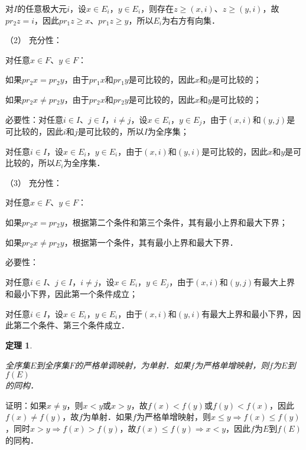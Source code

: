 \documentclass[12pt, a4paper, oneside]{book}
\newtheorem{theo}{定理}
\begin{document}
			对$I$的任意极大元$i$，设$x\in E_i$，$y\in E_i$，则存在$z\geq (x, i)$、$z\geq (y, i)$，故$pr_2z=i$，因此$pr_1z\geq x$、$pr_1z\geq y$，所以$E_i$为右方有向集．
			\par
			（2）	充分性：
			\par
			对任意$x\in F$、$y\in F$：
			\par
			如果$pr_2x=pr_2y$，由于$pr_1x$和$pr_1y$是可比较的，因此$x$和$y$是可比较的；
			\par
			如果$pr_2x\neq pr_2y$，由于$pr_2x$和$pr_2y$是可比较的，因此$x$和$y$是可比较的；
			\par
			必要性：对任意$i\in I$、$j\in I$，$i\neq j$，设$x\in E_i$，$y\in E_j$，由于$(x, i)$和$(y, j)$是可比较的，因此$i$和$j$是可比较的，所以$I$为全序集；
			\par
			对任意$i\in I$，设$x\in E_i$，$y\in E_i$，由于$(x, i)$和$(y, i)$是可比较的，因此$x$和$y$是可比较的，所以$E_i$为全序集．
			\par
			（3）	充分性：
			\par
			对任意$x\in F$、$y\in F$：
			\par
			如果$pr_2x=pr_2y$，根据第二个条件和第三个条件，其有最小上界和最大下界；
			\par
			如果$pr_2x\neq pr_2y$，根据第一个条件，其有最小上界和最大下界．
			\par
			必要性：
			\par
			对任意$i\in I$、$j\in I$，$i\neq j$，设$x\in E_i$，$y\in E_j$，由于$(x, i)$和$(y, j)$有最大上界和最小下界，因此第一个条件成立；
			\par
			对任意$i\in I$，设$x\in E_i$，$y\in E_i$，由于$(x, i)$和$(y, i)$有最大上界和最小下界，因此第二个条件、第三个条件成立．
			
			\begin{theo}\label{theo69}
				\hfill\par
				全序集$E$到全序集$F$的严格单调映射，为单射．如果$f$为严格单增映射，则$f$为$E$到$f(E)$\\的同构．
			\end{theo}
			证明：如果$x\neq y$，则$x<y\text{或}x>y$，故$f(x)<f(y)\text{或}f(y)<f(x)$，因此$f(x)\neq f(y)$，故$f$为单射．如果$f$为严格单增映射，则$x\leq y\Rightarrow f(x)\leq f(y)$，同时$x>y\Rightarrow f(x)>f(y)$，故$f(x)\leq f(y)\Rightarrow x<y$，因此$f$为$E$到$f(E)$的同构．
						
\end{document}
